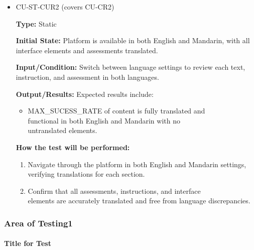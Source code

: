 \documentclass[12pt, titlepage]{article}
\begin{document}
\begin{itemize}
  \item CU-ST-CUR2 (covers CU-CR2)
  \begin{mdframed}[linewidth=0.5mm] 
    \textbf{Type:} Static \par 
    \textbf{Initial State:} Platform is available in both English and Mandarin, with all interface elements and assessments translated. \par 
    \textbf{Input/Condition:} Switch between language settings to review each text, instruction, and assessment in both languages. \par 
    \textbf{Output/Results:} Expected results include: 
    \begin{itemize} 
      \item MAX\_SUCESS\_RATE of content is fully translated and \\functional in both English and Mandarin with no \\untranslated elements. 
    \end{itemize} \par 
    \textbf{How the test will be performed:} 
    \begin{enumerate}[noitemsep] 
      \item Navigate through the platform in both English and Mandarin settings, verifying translations for each section. 
      \item Confirm that all assessments, instructions, and interface \\elements are accurately translated and free from language discrepancies. 
    \end{enumerate} 
  \end{mdframed} 
\end{itemize}



\subsubsection{Area of Testing1}
		
\paragraph{Title for Test}
\end{document}
